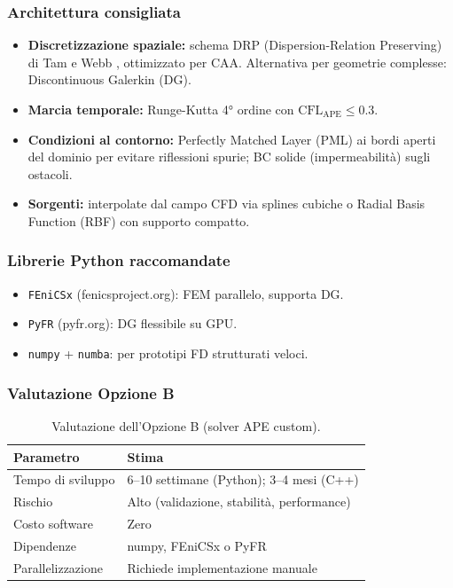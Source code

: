 \documentclass[11pt,a4paper]{article}
\begin{document}
\subsubsection{Architettura consigliata}

\begin{itemize}
  \item \textbf{Discretizzazione spaziale:} schema DRP (Dispersion-Relation
        Preserving) di Tam e Webb \cite{tam1993}, ottimizzato per CAA.
        Alternativa per geometrie complesse: Discontinuous Galerkin (DG).
  \item \textbf{Marcia temporale:} Runge-Kutta 4° ordine con
        $\mathrm{CFL}_\mathrm{APE} \leq 0.3$.
  \item \textbf{Condizioni al contorno:} Perfectly Matched Layer (PML) ai
        bordi aperti del dominio per evitare riflessioni spurie; BC solide
        (impermeabilità) sugli ostacoli.
  \item \textbf{Sorgenti:} interpolate dal campo CFD via splines cubiche o
        Radial Basis Function (RBF) con supporto compatto.
\end{itemize}

\subsubsection{Librerie Python raccomandate}

\begin{itemize}
  \item \texttt{FEniCSx} (fenicsproject.org): FEM parallelo, supporta DG.
  \item \texttt{PyFR} (pyfr.org): DG flessibile su GPU.
  \item \texttt{numpy} + \texttt{numba}: per prototipi FD strutturati veloci.
\end{itemize}

\subsubsection{Valutazione Opzione B}

\begin{table}[H]
  \centering
  \caption{Valutazione dell'Opzione B (solver APE custom).}
  \begin{tabular}{ll}
    \toprule
    \textbf{Parametro} & \textbf{Stima} \\
    \midrule
    Tempo di sviluppo & 6–10 settimane (Python); 3–4 mesi (C++) \\
    Rischio & Alto (validazione, stabilità, performance) \\
    Costo software & Zero \\
    Dipendenze & numpy, FEniCSx o PyFR \\
    Parallelizzazione & Richiede implementazione manuale \\
    \bottomrule
  \end{tabular}
\end{table}
\end{document}
